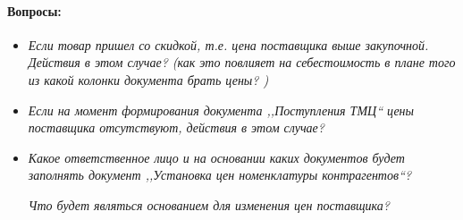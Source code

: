 \paragraph{Вопросы:}
\begin{itemize}	
	\item \emph{Если товар пришел со скидкой, т.е. цена поставщика выше закупочной. Действия в этом случае? (как это повлияет на себестоимость в плане того из какой колонки документа брать цены? )}
	\item \emph{Если на момент формирования документа ,,Поступления ТМЦ`` цены поставщика отсутствуют, действия в этом случае?}
	\item \emph{Какое ответственное лицо и на основании каких документов будет заполнять документ ,,Установка цен номенклатуры контрагентов``?} \par \emph{Что будет являться основанием для изменения цен поставщика?}
\end{itemize}
	
	
	




